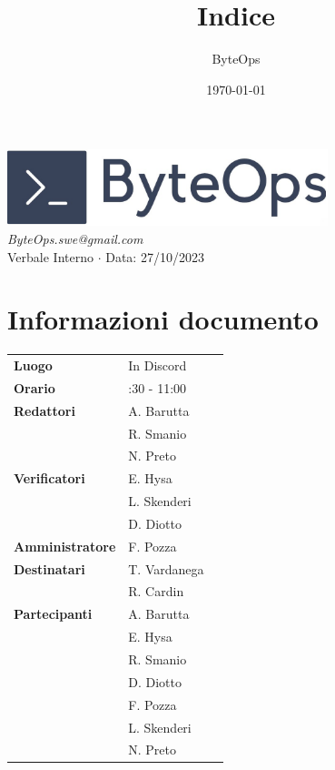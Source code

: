 \documentclass{article}
\title{\textbf{\fontsize{30}{6}\selectfont Indice}}
\author{\fontsize{14}{6}\selectfont ByteOps}
\date{\today}
\begin{document}
\pagestyle{fancy}
\begin{center}
\includegraphics[width = 0.7\textwidth]{../../../Images/logo.png} \\
\vspace{0.2cm}
\textcolor[RGB]{60, 60, 60}{\textit{ByteOps.swe@gmail.com}} \\
\vspace{1cm}
\fontsize{16}{6}\selectfont Verbale Interno $\cdot$ Data: 27/10/2023 \\
\vspace{0.5cm}
\end{center}

\section*{Informazioni documento}
\def\arraystretch{1.2}
\begin{tabular}{>{\raggedleft\arraybackslash}p{}|>{\raggedright\arraybackslash}p{}c}
\hline
\addlinespace
    \textbf{Luogo} & In Discord \vspace{10pt} \\
    \textbf{Orario} & 9:30 - 11:00 \vspace{10pt} \\
    \textbf{Redattori} & A. Barutta \\ & R. Smanio \\ & N. Preto \vspace{10pt} \\
    \textbf{Verificatori} & E. Hysa \\ & L. Skenderi \\ & D. Diotto \vspace{10pt} \\
    \textbf{Amministratore} & F. Pozza \vspace{10pt} \\
    \textbf{Destinatari} & T. Vardanega \\ & R. Cardin \vspace{10pt} \\
    \textbf{Partecipanti} & A. Barutta \\ & E. Hysa \\ & R. Smanio \\ & D. Diotto \\ & F. Pozza \\ & L. Skenderi \\ & N. Preto \vspace{10pt} \\
\end{tabular}
\pagebreak 
\end{document}
